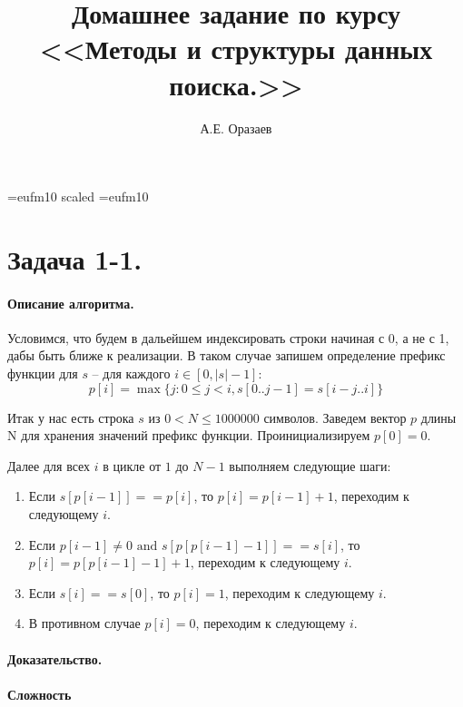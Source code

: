 \documentclass[12pt]{article}
\title{\bf Домашнее задание по курсу \\ <<Методы
и структуры данных поиска.>>}
\author{А.Е. Оразаев}
\date{}
\begin{document}
\voffset=-20mm
\hoffset=-12mm
\font\Got=eufm10 scaled \font\Got=eufm10

\maketitle

\section{Задача 1-1.}
\paragraph{Описание алгоритма.}
Условимся, что будем в дальейшем индексировать строки начиная с 0,
а не с 1, дабы быть ближе к реализации. В таком случае запишем определение
префикс функции для $ s $ -- для каждого $ i \in [0, |s| - 1] $:
$$
    p[i] = \max\{j: 0 \le j < i, s[0 .. j - 1] = s[i - j .. i]\}
$$

Итак у нас есть строка $ s $ из $ 0 < N \le 1000000$ символов.
Заведем вектор $ p $ длины N для хранения значений префикс функции.
Проинициализируем $ p[0] = 0 $.

Далее для всех $ i $ в цикле от $ 1 $ до $ N - 1 $ выполняем следующие шаги:
\begin{enumerate}
    \item Если $ s[p[i - 1]] == p[i] $, то $ p[i] = p[i - 1] + 1 $, переходим
          к следующему $ i $.
    \item Если $ p[i - 1] \ne 0 \mbox{  and  } s[p[p[i - 1] - 1]] == s[i] $, то
          $ p[i] = p[p[i - 1] - 1] + 1 $, переходим к следующему $ i $.
    \item Если $ s[i] == s[0] $, то $ p[i] = 1 $, переходим к следующему
          $ i $.
    \item В противном случае $ p[i] = 0 $, переходим к следующему $ i $.
\end{enumerate}







\paragraph{Доказательство.}

\paragraph{Сложность}
\end{document}
